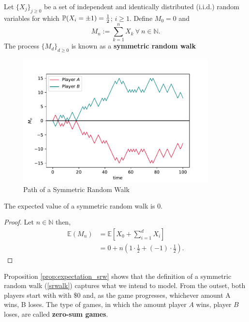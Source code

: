 \documentclass[../TGMAFFIRO]{subfiles}
\begin{document}
\begin{definition}\label{srwalk}
	Let $\{X_j\}_{j\geq0}$ be a set of independent and identically distributed (i.i.d.) random variables for which $\mathbb{P}(X_i = \pm 1) = \frac{1}{2}$; $i \geq 1$. Define $M_0 = 0$ and
	\begin{equation}
		M_n := \sum_{k=1}^n X_k \ \forall \ n \in \mathbb{N}.
	\end{equation}
	The process $\{M_d\}_{d\geq 0}$ is known as a \textbf{symmetric random walk}
\end{definition}

\begin{figure}
	\label{fig:symmetric_random_walk}
	\centering
	\includegraphics[width=0.9\textwidth]{../images/symmetric_random_walk}
	\caption{Path of a Symmetric Random Walk}
\end{figure}

\begin{proposition}\label{prop:expectation_srw}
	The expected value of a symmetric random walk is 0.
\end{proposition}

\begin{proof}
	Let $n \in \mathbb{N}$ then,
	\begin{align*}
	\mathbb{E}(M_n) &= \mathbb{E}\left[X_0 + \sum_{i=1}^d X_i\right]\\
				    &= 0 + n  \left( 1 \cdot \frac{1}{2} + (-1) \cdot \frac{1}{2}\right).
	\end{align*}
\end{proof}

Proposition \ref{prop:expectation_srw} shows that the definition of a symmetric random walk (\ref{srwalk}) captures what we intend to model. From the outset, both players start with with \$0 and, as the game progresses, whichever amount A wins, B loses. The type of games, in which the amount player $A$ wins, player $B$ loses, are called \textbf{zero-sum games}.\\
\end{document}
